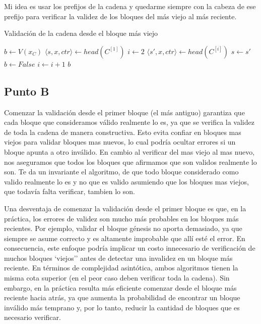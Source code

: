 \documentclass[12pt]{article}
\begin{document}
Mi idea es usar los prefijos de la cadena y quedarme siempre con la cabeza de ese prefijo para verificar la validez de los bloques del más viejo al más reciente.  

\begin{algorithm}[H]
\caption{Validación de la cadena desde el bloque más viejo}
\begin{algorithmic}[1]
    \State $b \gets V(x_C)$ 
        \State $\langle s, x, ctr \rangle \gets head(C^{[1]})$ 
         
            \State $i \gets 2$ 
            \Repeat {}
                \State $\langle s', x, ctr \rangle \gets head(C^{[i]})$ 
                 
                    \State $s \gets s'$ 
                \Else
                    \State $b \gets False$
                \EndIf
                \State $i \gets i + 1$
        \EndIf
    \EndIf
    \State \Return $b$
\EndFunction
\end{algorithmic}
\end{algorithm}

\subsection*{Punto B}

Comenzar la validación desde el primer bloque (el más antiguo) garantiza que cada bloque que consideramos válido realmente lo es, ya que se verifica la validez de toda la cadena de manera constructiva. Esto evita confiar en bloques mas viejos para validar bloques mas nuevos, lo cual podría ocultar errores si un bloque apunta a otro inválido. En cambio al verificar del mas viejo al mas nuevo, nos aseguramos que todos los bloques que afirmamos que son validos realmente lo son.
Te da un invariante el algoritmo, de que todo bloque considerado como valido realmente lo es y no que es valido asumiendo que los bloques mas viejos, que todavía falta verificar, tambien lo son. 

Una desventaja de comenzar la validación desde el primer bloque es que, en la práctica, los errores de validez son mucho más probables en los bloques más recientes. Por ejemplo, validar el bloque génesis no aporta demasiado, ya que siempre se asume correcto y es altamente improbable que allí esté el error. En consecuencia, este enfoque podría implicar un costo innecesario de verificación de muchos bloques `viejos'' antes de detectar una invalidez en un bloque más reciente. En términos de complejidad asintótica, ambos algoritmos tienen la misma cota superior (en el peor caso deben verificar toda la cadena). Sin embargo, en la práctica resulta más eficiente comenzar desde el bloque más reciente hacia atrás, ya que aumenta la probabilidad de encontrar un bloque inválido más temprano y, por lo tanto, reducir la cantidad de bloques que es necesario verificar.
\end{document}
